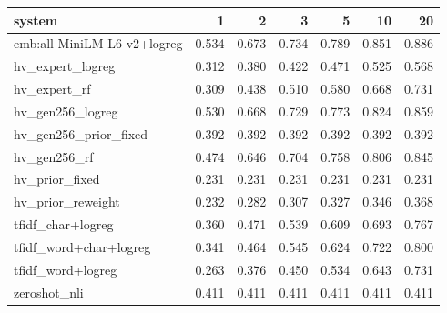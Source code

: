 \begin{tabular}{lrrrrrr}
\toprule
system & 1 & 2 & 3 & 5 & 10 & 20 \\
\midrule
emb:all-MiniLM-L6-v2+logreg & 0.534 & 0.673 & 0.734 & 0.789 & 0.851 & 0.886 \\
hv\_expert\_logreg & 0.312 & 0.380 & 0.422 & 0.471 & 0.525 & 0.568 \\
hv\_expert\_rf & 0.309 & 0.438 & 0.510 & 0.580 & 0.668 & 0.731 \\
hv\_gen256\_logreg & 0.530 & 0.668 & 0.729 & 0.773 & 0.824 & 0.859 \\
hv\_gen256\_prior\_fixed & 0.392 & 0.392 & 0.392 & 0.392 & 0.392 & 0.392 \\
hv\_gen256\_rf & 0.474 & 0.646 & 0.704 & 0.758 & 0.806 & 0.845 \\
hv\_prior\_fixed & 0.231 & 0.231 & 0.231 & 0.231 & 0.231 & 0.231 \\
hv\_prior\_reweight & 0.232 & 0.282 & 0.307 & 0.327 & 0.346 & 0.368 \\
tfidf\_char+logreg & 0.360 & 0.471 & 0.539 & 0.609 & 0.693 & 0.767 \\
tfidf\_word+char+logreg & 0.341 & 0.464 & 0.545 & 0.624 & 0.722 & 0.800 \\
tfidf\_word+logreg & 0.263 & 0.376 & 0.450 & 0.534 & 0.643 & 0.731 \\
zeroshot\_nli & 0.411 & 0.411 & 0.411 & 0.411 & 0.411 & 0.411 \\
\bottomrule
\end{tabular}
